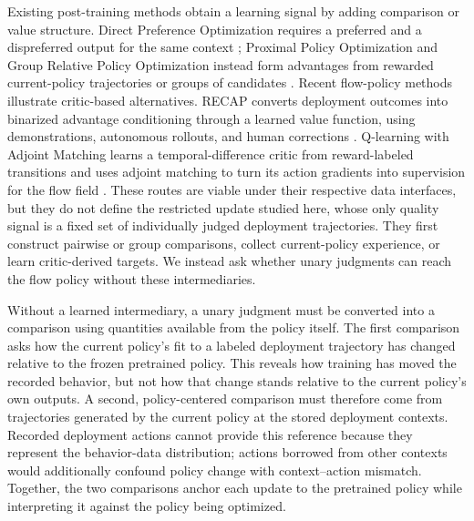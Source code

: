 Existing post-training methods obtain a learning signal by adding comparison or
value structure. Direct Preference Optimization requires a preferred and a
dispreferred output for the same context \cite{rafailov2023dpo}; Proximal Policy
Optimization and Group Relative Policy Optimization instead form advantages
from rewarded current-policy trajectories or groups of candidates
\cite{schulman2017ppo,schulman2016gae,shao2024deepseekmath}. Recent flow-policy
methods illustrate critic-based alternatives. RECAP converts deployment
outcomes into binarized advantage conditioning through a learned value function,
using demonstrations, autonomous rollouts, and human corrections
\cite{physicalintelligence2025pi06star}. Q-learning with Adjoint Matching learns
a temporal-difference critic from reward-labeled transitions and uses adjoint
matching to turn its action gradients into supervision for the flow field
\cite{li2026qam}. These routes are viable under their respective data
interfaces, but they do not define the restricted update studied here, whose
only quality signal is a fixed set of individually judged deployment
trajectories. They first construct pairwise or group comparisons, collect
current-policy experience, or learn critic-derived targets. We instead ask
whether unary judgments can reach the flow policy without these intermediaries.

Without a learned intermediary, a unary judgment must be converted into a
comparison using quantities available from the policy itself. The first
comparison asks how the current policy's fit to a labeled deployment trajectory
has changed relative to the frozen pretrained policy. This reveals how training
has moved the recorded behavior, but not how that change stands relative to the
current policy's own outputs. A second, policy-centered comparison must therefore
come from trajectories generated by the current policy at the stored deployment
contexts. Recorded deployment actions cannot provide this reference because
they represent the behavior-data distribution; actions borrowed from other
contexts would additionally confound policy change with context--action
mismatch. Together, the two comparisons anchor each update to the pretrained
policy while interpreting it against the policy being optimized.

